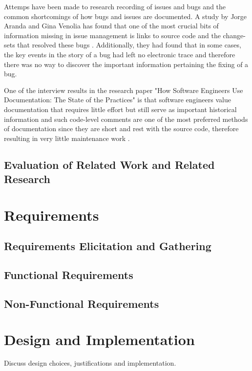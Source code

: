 \documentclass{4thYearProject}
\begin{document}
Attemps have been made to research recording of issues and bugs and the common shortcomings of how bugs and issues are documented. A study by Jorge Aranda and Gina Venolia has found that one of the most crucial bits of information missing in issue management is links to source code and the change-sets that resolved these bugs \cite{lifeofbugs}. Additionally, they had found that in some cases, the key events in the story of a bug had left no electronic trace and therefore there was no way to discover the important information pertaining the fixing of a bug.

One of the interview results in the research paper "How Software Engineers Use Documentation: The State of the Practices" is that software engineers value documentation that requires little effort but still serve as important historical information and such code-level comments are one of the most preferred methods of documentation since they are short and rest with the source code, therefore resulting in very little maintenance work  \cite{stateofpractice}. 

\section{Evaluation of Related Work and Related Research}

\chapter{Requirements}

\section{Requirements Elicitation and Gathering}


\section{Functional Requirements}

\newpage
\section{Non-Functional Requirements}

\chapter{Design and Implementation}

Discuss design choices, justifications and implementation.
\end{document}
